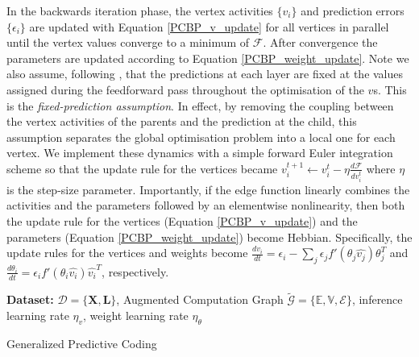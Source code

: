 In the backwards iteration phase, the vertex activities $\{ v_i \}$ and prediction errors $\{\epsilon_i \}$ are updated with Equation \ref{PCBP_v_update} for all vertices in parallel until the vertex values converge to a minimum of $\mathcal{F}$. After convergence the parameters are updated according to Equation \ref{PCBP_weight_update}. Note we also assume, following \citet{whittington2017approximation}, that the predictions at each layer are fixed at the values assigned during the feedforward pass throughout the optimisation of the $v$s. This is the \emph{fixed-prediction assumption}. In effect, by removing the coupling between the vertex activities of the parents and the prediction at the child, this assumption separates the global optimisation problem into a local one for each vertex. We implement these dynamics with a simple forward Euler integration scheme so that the update rule for the vertices became $v_i^{t+1} \leftarrow v_i^t - \eta \frac{d\mathcal{F}}{dv_i^t}$
where $\eta$ is the step-size parameter. Importantly, if the edge function linearly combines the activities and the parameters followed by an elementwise nonlinearity, then both the update rule for the vertices (Equation \ref{PCBP_v_update}) and the parameters (Equation \ref{PCBP_weight_update}) become Hebbian. Specifically, the update rules for the vertices and weights become $\frac{dv_i}{dt} = \epsilon_i - \sum_j \epsilon_j f'(\theta_j \hat{v_j}) \theta_j^T$ and $\frac{d\theta_i}{dt} = \epsilon_i f'(\theta_i \hat{v_i}) \hat{v_i}^T$, respectively.

\begin{algorithm}[H]
\SetAlgoLined
\DontPrintSemicolon
\textbf{Dataset:} $\mathcal{D} = \{\mathbf{X},\mathbf{L}\}$, Augmented Computation Graph $\tilde{\mathcal{G}} = \{\mathbb{E},\mathbb{V},\mathcal{E}\}$, inference learning rate $\eta_v$, weight learning rate $\eta_\theta$
\BlankLine

\caption{Generalized Predictive Coding \label{general_alg_pseudocode}}
\end{algorithm}

